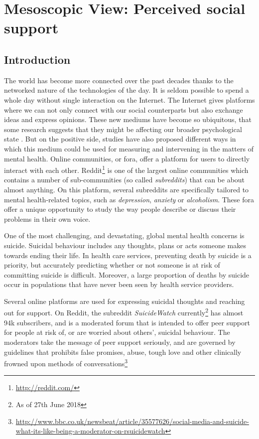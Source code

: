 \chapter{Mesoscopic View: Perceived social support}
\label{chap:structure_support}


\graphicspath{{Chapter4/plots/}}

\section{Introduction}

The world has become more connected over the past decades thanks to the networked nature of the technologies of the day. It is seldom possible to spend a whole day without single interaction on the Internet. The Internet gives platforms where we can not only connect with our social counterparts but also exchange ideas and express opinions. These new mediums have become so ubiquitous, that some research suggests that they might be affecting our broader psychological state \cite{d20122}. But on the positive side, studies have also proposed different ways in which this medium could be used for measuring and intervening in the matters of mental health\cite{DeChoudhury2016,DeChoudhury2014}.
Online communities, or fora, offer a platform for users to directly interact with each other. Reddit\footnote{\url{http://reddit.com/}} is one of the largest online communities which contains a number of sub-communities (so called \emph{subreddits}) that can be about almost anything. On this platform, several subreddits are specifically tailored to mental health-related topics, such as \emph{depression}, \emph{anxiety} or \emph{alcoholism}. These fora offer a unique opportunity to study the way people describe or discuss their problems in their own voice.

One of the most challenging, and devastating, global mental health concerns is suicide. Suicidal behaviour includes any thoughts, plans or acts someone makes towards ending their life. In health care services, preventing death by suicide is a priority, but accurately predicting whether or not someone is at risk of committing suicide is difficult. Moreover, a large proportion of deaths by suicide occur in populations that have never been seen by health service providers.

Several online platforms are used for expressing suicidal thoughts and reaching out for support. On Reddit, the subreddit \emph{SuicideWatch} currently\footnote{As of 27th June 2018} has almost 94k subscribers, and is a moderated forum that is intended to offer peer support for people at risk of, or are worried about others', suicidal behaviour. The moderators take the message of peer support seriously, and are governed by guidelines that prohibits false promises, abuse, tough love and other clinically frowned upon methods of conversations\footnote{\url{http://www.bbc.co.uk/newsbeat/article/35577626/social-media-and-suicide-what-its-like-being-a-moderator-on-rsuicidewatch} }

